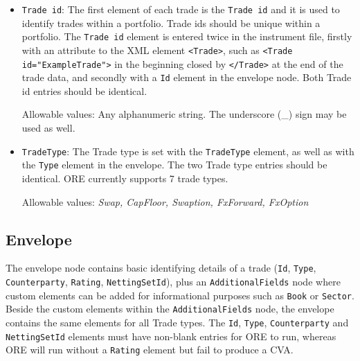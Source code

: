 \begin{itemize}
\item {\tt Trade id}: The first element of each trade is the {\tt Trade id} and it is used to identify trades within a portfolio. Trade ids should be unique within a portfolio.  The {\tt Trade id} element is entered twice in the instrument file, firstly with an attribute to the XML element {\tt <Trade>}, such as {\tt <Trade id="ExampleTrade">}  in the beginning closed by {\tt </Trade>}  at the end of the trade data, and secondly with a {\tt Id} element  in the envelope node.   Both Trade id entries should be identical.

Allowable values:  Any alphanumeric string. The underscore (\_) sign may be used as well. 


\item {\tt TradeType}: The Trade type is set with the {\tt TradeType} element, as well as with the {\tt Type} element in the envelope. The two Trade type entries should be identical. ORE currently supports 7 trade types.  

Allowable values:  \emph{Swap, CapFloor, Swaption, FxForward, FxOption}


\end{itemize}

\subsection{Envelope}\label{ss:envelope}
The envelope node contains basic identifying details of a trade ({\tt Id}, {\tt Type}, {\tt Counterparty}, {\tt Rating}, {\tt NettingSetId}), plus an {\tt AdditionalFields} node where custom elements can be added for informational purposes such as {\tt Book} or {\tt Sector}. Beside the custom elements within the {\tt AdditionalFields} node, the envelope contains the same elements for all Trade types.  The {\tt Id}, {\tt Type}, {\tt Counterparty} and {\tt NettingSetId} elements must have non-blank entries for ORE to run, whereas ORE will run without a {\tt Rating} element but fail to produce a CVA.

\vspace{1em}

